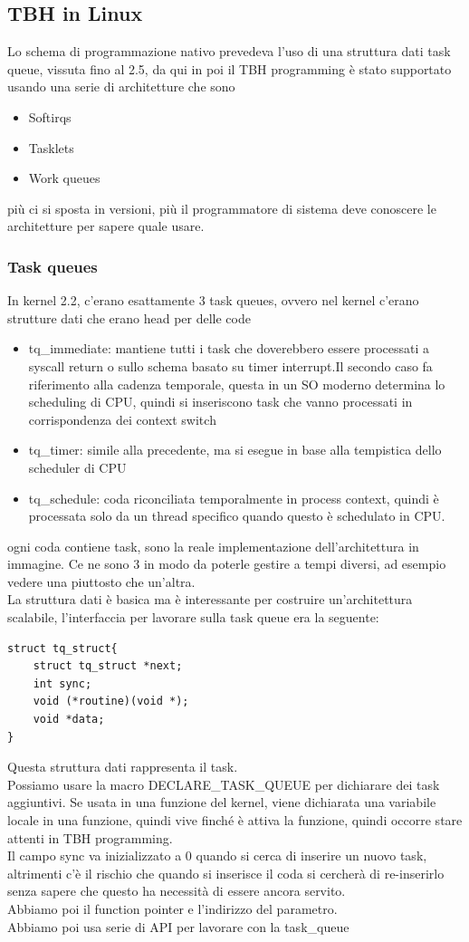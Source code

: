 \documentclass[12pt, oneside]{extbook}
\begin{document}
\subsection{TBH in Linux}
Lo schema di programmazione nativo prevedeva l'uso di una struttura dati task queue, vissuta fino al 2.5, da qui in poi il TBH programming è stato supportato usando una serie di architetture che sono 
\begin{itemize}
\item Softirqs
\item Tasklets
\item Work queues
\end{itemize}
più ci si sposta in versioni, più il programmatore di sistema deve conoscere le architetture per sapere quale usare.\\
\subsubsection{Task queues}
In kernel 2.2, c'erano esattamente 3 task queues, ovvero nel kernel c'erano strutture dati che erano head per delle code
\begin{itemize}
\item tq\_immediate: mantiene tutti i task che doverebbero essere processati a syscall return o sullo schema basato su timer interrupt.Il secondo caso fa riferimento alla cadenza temporale, questa in un SO moderno determina lo scheduling di CPU, quindi si inseriscono task che vanno processati in corrispondenza dei context switch
\item tq\_timer: simile alla precedente, ma si esegue in base alla tempistica dello scheduler di CPU
\item tq\_schedule: coda riconciliata temporalmente in process context, quindi è processata solo da un thread specifico quando questo è schedulato in CPU.
\end{itemize}
ogni coda contiene task, sono la reale implementazione dell'architettura in immagine. Ce ne sono 3 in modo da poterle gestire a tempi diversi, ad esempio vedere una piuttosto che un'altra.\\La struttura dati è basica ma è interessante per costruire un'architettura scalabile, l'interfaccia per lavorare sulla task queue era la seguente:
\begin{lstlisting}
struct tq_struct{
	struct tq_struct *next;
	int sync;
	void (*routine)(void *);
	void *data;
}
\end{lstlisting}
Questa struttura dati rappresenta il task.\\Possiamo usare la macro \textsf{DECLARE\_TASK\_QUEUE} per dichiarare dei task aggiuntivi. Se usata in una funzione del kernel, viene dichiarata una variabile locale in una funzione, quindi vive finché è attiva la funzione, quindi occorre stare attenti in TBH programming.\\Il campo sync va inizializzato a 0 quando si cerca di inserire un nuovo task, altrimenti c'è il rischio che quando si inserisce il coda si cercherà di re-inserirlo senza sapere che questo ha necessità di essere ancora servito.\\Abbiamo poi il function pointer e l'indirizzo del parametro.\\ Abbiamo poi usa serie di API per lavorare con la task\_queue
\end{document}
